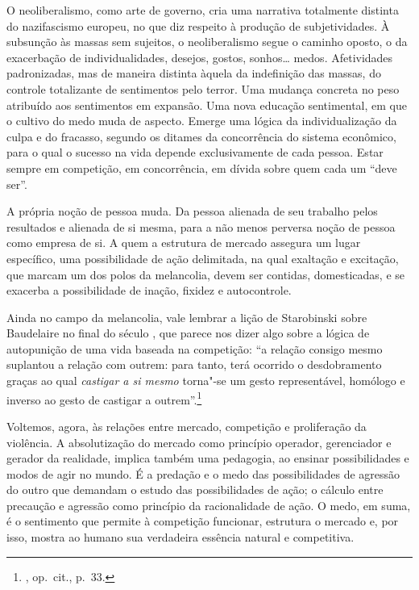 \asterisc

O neoliberalismo, como arte de governo, cria uma narrativa totalmente
distinta do nazifascismo europeu, no que diz respeito à produção de
subjetividades. À subsunção às massas sem sujeitos, o neoliberalismo
segue o caminho oposto, o da exacerbação de individualidades, desejos,
gostos, sonhos\ldots{} medos. Afetividades padronizadas, mas de maneira
distinta àquela da indefinição das massas, do controle totalizante de
sentimentos pelo terror. Uma mudança concreta no peso atribuído aos
sentimentos em expansão. Uma nova educação sentimental, em que o cultivo
do medo muda de aspecto. Emerge uma lógica da individualização da culpa
e do fracasso, segundo os ditames da concorrência do sistema econômico,
para o qual o sucesso na vida depende exclusivamente de cada pessoa.
Estar sempre em competição, em concorrência, em dívida sobre quem cada
um ``deve ser''.

A própria noção de pessoa muda. Da pessoa alienada de seu trabalho pelos
resultados e alienada de si mesma, para a não menos perversa noção de
pessoa como empresa de si. A quem a estrutura de mercado assegura
um lugar específico, uma possibilidade de ação delimitada, na qual
exaltação e excitação, que marcam um dos polos da melancolia, devem ser
contidas, domesticadas, e se exacerba a possibilidade de inação, fixidez
e autocontrole.

Ainda no campo da melancolia, vale lembrar a lição de Starobinski sobre
Baudelaire no final do século , que parece nos dizer algo sobre a
lógica de autopunição de uma vida baseada na competição: ``a relação
consigo mesmo suplantou a relação com outrem: para tanto, terá ocorrido
o desdobramento graças ao qual \emph{castigar a si mesmo} torna"-se um
gesto representável, homólogo e inverso ao gesto de castigar a
outrem''.\footnote{, op.~cit., p.~33.}

\asterisc

Voltemos, agora, às relações entre mercado, competição e proliferação da violência.
A absolutização do mercado como princípio operador, gerenciador e
gerador da realidade, implica também uma pedagogia, ao ensinar
possibilidades e modos de agir no mundo. É a predação e o medo das
possibilidades de agressão do outro que demandam o estudo das
possibilidades de ação; o cálculo entre precaução e agressão como
princípio da racionalidade de ação. O medo, em suma, é o sentimento que
permite à competição funcionar, estrutura o mercado e, por isso, mostra ao humano
sua verdadeira essência natural e competitiva.

